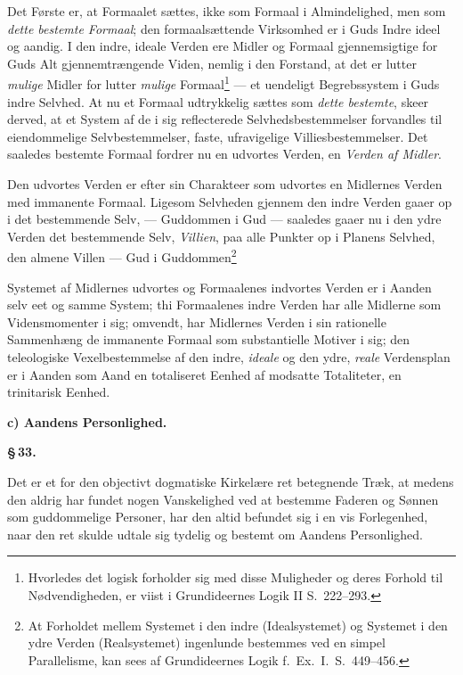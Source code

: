 \documentclass[12pt]{book}
\newcommand{\parmark}[1]{\begin{center}{\bfseries \S\,#1.}\end{center}}
\newcommand{\runhead}[1]{%
  \medskip\begin{center}{\bfseries #1}\end{center}\medskip}
\begin{document}
Det Første er, at Formaalet sættes, ikke som Formaal i
Almindelighed, men som \emph{dette bestemte Formaal};
den formaalsættende Virksomhed er i Guds Indre ideel og aandig. I
den indre, ideale Verden ere Midler og Formaal gjennemsigtige for
Guds Alt gjennemtrængende Viden, nemlig i den Forstand, at det er
lutter \emph{mulige} Midler for lutter \emph{mulige}
Formaal\footnote{Hvorledes det logisk forholder sig med disse
Muligheder og deres Forhold til Nødvendigheden, er viist i
Grundideernes Logik II S.\ 222--293.} --- et uendeligt
Begrebssystem i Guds indre Selvhed. At nu et Formaal udtrykkelig
sættes som \emph{dette bestemte}, skeer derved, at et System af de i
sig reflecterede Selvhedsbestemmelser forvandles til eiendommelige
Selvbestemmelser, faste, ufravigelige Villiesbestemmelser. Det
saaledes bestemte Formaal fordrer nu en udvortes Verden, en
\emph{Verden af Midler}.

Den udvortes Verden er efter sin Charakteer som udvortes en
Midlernes Verden med immanente Formaal. Ligesom Selvheden gjennem
den indre Verden gaaer op i det bestemmende Selv, --- Guddommen i
Gud --- saaledes gaaer nu i den ydre Verden det bestemmende Selv,
\emph{Villien}, paa alle Punkter op i Planens Selvhed, den almene
Villen --- Gud i Guddommen\footnote{At Forholdet mellem Systemet i
den indre (Idealsystemet) og Systemet i den ydre Verden
(Realsystemet) ingenlunde bestemmes ved en simpel Parallelisme, kan
sees af Grundideernes Logik f.\ Ex.\ I.\ S.\ 449--456.}

Systemet af Midlernes udvortes og Formaalenes indvortes Verden er i
Aanden selv eet og samme System; thi Formaalenes indre Verden har
alle Midlerne som Vidensmomenter i sig; omvendt, har Midlernes
Verden i sin rationelle Sammenhæng de immanente Formaal som
substantielle Motiver i sig; den teleologiske Vexelbestemmelse af
den indre, \emph{ideale} og den ydre, \emph{reale} Verdensplan er i
Aanden som Aand en totaliseret Eenhed af modsatte Totaliteter, en
trinitarisk Eenhed.

\runhead{c) Aandens Personlighed.}
\parmark{33}

Det er et for den objectivt dogmatiske Kirkelære ret betegnende
Træk, at medens den aldrig har fundet nogen Vanskelighed ved at
bestemme Faderen og Sønnen som guddommelige Personer, har den altid
befundet sig i en vis Forlegenhed, naar den ret skulde udtale sig
tydelig og bestemt om Aandens Personlighed.
\end{document}
